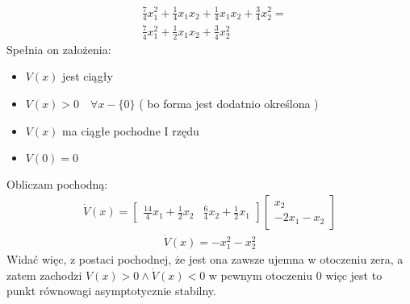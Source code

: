 \documentclass[a4paper,11pt]{article}
\begin{document}
\begin{align*}
& \frac{7}{4}x_{1}^{2}+\frac{1}{4}x_{1}x_{2}+\frac{1}{4}x_{1}x_{2}+\frac{3}{4}x_{2}^{2} = \\
& \frac{7}{4}x_{1}^{2}+\frac{1}{2}x_{1}x_{2}+\frac{3}{4}x_{2}^{2}
\end{align*}
Spełnia on założenia: \\
\begin{itemize}
\item \( V(x) \) jest ciągły 
\item \( V(x)>0 \quad \forall x - \{ 0 \} \) ( bo forma jest dodatnio określona )
\item \( V(x) \) ma ciągłe pochodne I rzędu
\item \( V(0) = 0 \) 
\end{itemize}
Obliczam pochodną: \\ 
\begin{align*}
\dot{V}(x)= 
\begin{bmatrix}
\frac{14}{4}x_{1}+\frac{1}{2}x_{2} & \frac{6}{4}x_{2}+\frac{1}{2}x_{1}
\end{bmatrix}
\begin{bmatrix}
x_{2} \\
-2x_{1} - x_{2}
\end{bmatrix}   
\end{align*}
\begin{align*}
\dot{V}(x) = -x_{1}^{2}-x_{2}^{2}
\end{align*}
Widać więc, z postaci pochodnej, że jest ona zawsze ujemna w otoczeniu zera, a zatem zachodzi \( V(x) > 0 \land \dot{V}(x) < 0 \) w pewnym otoczeniu 0 więc jest to punkt równowagi asymptotycznie stabilny. 
\end{document}

